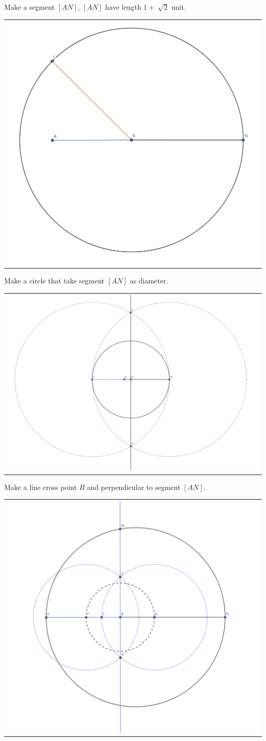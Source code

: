 \documentclass[letter,12pt]{article}
\begin{document}
Make a segment $[AN]$, $[AN]$ have length $1 + \sqrt[]{2}$ unit.
\begin{center}
	\begin{tabular}{c}
		\includegraphics[width=0.5\columnwidth]{Q1B_4.png} \\
	\end{tabular}
\end{center}

Make a circle that take segment $[AN]$ as diameter.
\begin{center}
	\begin{tabular}{c}
		\includegraphics[width=0.7\columnwidth]{Q1B_5.png} \\
	\end{tabular}
\end{center}

Make a line cross point $B$ and perpendicular to segment $[AN]$.
\begin{center}
	\begin{tabular}{c}
		\includegraphics[width=0.7\columnwidth]{Q1B_6.png} \\
	\end{tabular}
\end{center}
\end{document}
